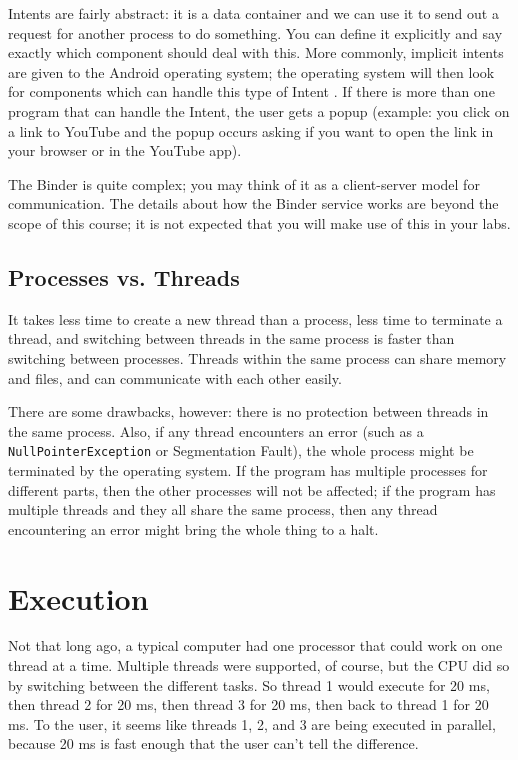 Intents are fairly abstract: it is a data container and we can use it to send out a request for another process to do something. You can define it explicitly and say exactly which component should deal with this. More commonly, implicit intents are given to the Android operating system; the operating system will then look for components which can handle this type of Intent \cite{vogella}. If there is more than one program that can handle the Intent, the user gets a popup (example: you click on a link to YouTube and the popup occurs asking if you want to open the link in your browser or in the YouTube app). 

The Binder is quite complex; you may think of it as a client-server model for communication. The details about how the Binder service works are beyond the scope of this course; it is not expected that you will make use of this in your labs.

\subsection*{Processes vs. Threads}

It takes less time to create a new thread than a process, less time to terminate a thread, and switching between threads in the same process is faster than switching between processes. Threads within the same process can share memory and files, and can communicate with each other easily. 

There are some drawbacks, however: there is no protection between threads in the same process. Also, if any thread encounters an error (such as a \texttt{NullPointerException} or Segmentation Fault), the whole process might be terminated by the operating system. If the program has multiple processes for different parts, then the other processes will not be affected; if the program has multiple threads and they all share the same process, then any thread encountering an error might bring the whole thing to a halt.
 

\section*{Execution}
Not that long ago, a typical computer had one processor that could work on one thread at a time. Multiple threads were supported, of course, but the CPU did so by switching between the different tasks. So thread 1 would execute for 20 ms, then thread 2 for 20 ms, then thread 3 for 20 ms, then back to thread 1 for 20 ms. To the user, it seems like threads 1, 2, and 3 are being executed in parallel, because 20 ms is fast enough that the user can't tell the difference.

